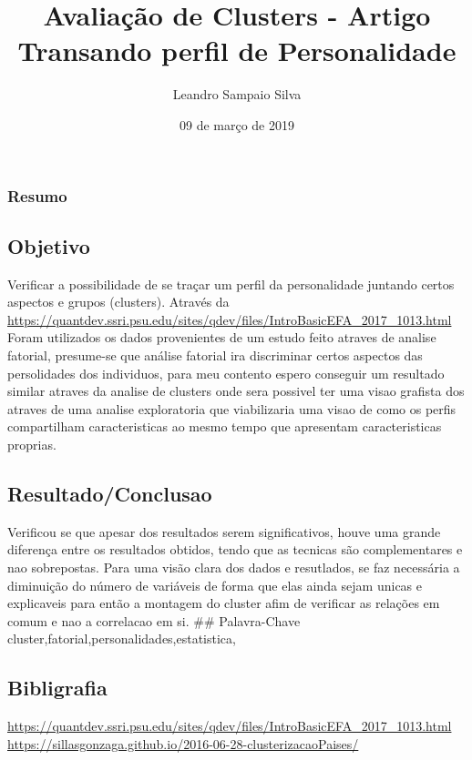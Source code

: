 \documentclass[]{article}
\title{Avaliação de Clusters - Artigo Transando perfil de Personalidade}
\author{Leandro Sampaio Silva}
\date{09 de março de 2019}
\begin{document}
\maketitle

\hypertarget{resumo}{%
\subsubsection{Resumo}\label{resumo}}

\hypertarget{objetivo}{%
\subsection{Objetivo}\label{objetivo}}

Verificar a possibilidade de se traçar um perfil da personalidade
juntando certos aspectos e grupos (clusters). Através da
\url{https://quantdev.ssri.psu.edu/sites/qdev/files/IntroBasicEFA_2017_1013.html}
Foram utilizados os dados provenientes de um estudo feito atraves de
analise fatorial, presume-se que análise fatorial ira discriminar certos
aspectos das persolidades dos individuos, para meu contento espero
conseguir um resultado similar atraves da analise de clusters onde sera
possivel ter uma visao grafista dos atraves de uma analise exploratoria
que viabilizaria uma visao de como os perfis compartilham
caracteristicas ao mesmo tempo que apresentam caracteristicas proprias.

\hypertarget{resultadoconclusao}{%
\subsection{Resultado/Conclusao}\label{resultadoconclusao}}

Verificou se que apesar dos resultados serem significativos, houve uma
grande diferença entre os resultados obtidos, tendo que as tecnicas são
complementares e nao sobrepostas. Para uma visão clara dos dados e
resutlados, se faz necessária a diminuição do número de variáveis de
forma que elas ainda sejam unicas e explicaveis para então a montagem do
cluster afim de verificar as relações em comum e nao a correlacao em si.
\#\# Palavra-Chave cluster,fatorial,personalidades,estatistica,

\hypertarget{bibligrafia}{%
\subsection{Bibligrafia}\label{bibligrafia}}

\url{https://quantdev.ssri.psu.edu/sites/qdev/files/IntroBasicEFA_2017_1013.html}
\url{https://sillasgonzaga.github.io/2016-06-28-clusterizacaoPaises/}
\end{document}
